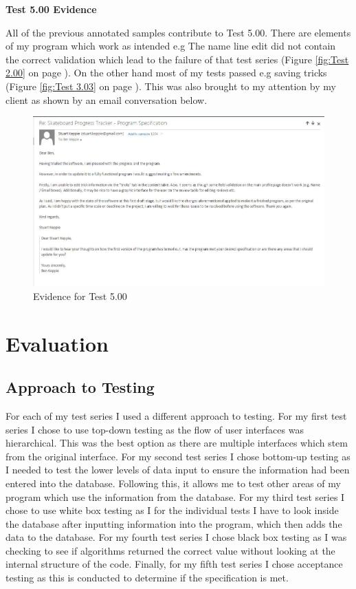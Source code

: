 \textbf{Test 5.00 Evidence}

All of the previous annotated samples contribute to Test 5.00. There are elements of my program which work as intended e.g The name line edit did not contain the correct validation which lead to the failure of that test series  (Figure \ref{fig:Test 2.00} on page \pageref{fig:Test 2.00}). On the other hand most of my tests passed e.g saving tricks  (Figure \ref{fig:Test 3.03} on page \pageref{fig:Test 3.03}). This was also brought to my attention by my client as shown by an email conversation below.


\begin{figure}[H]
    \includegraphics[width=\textwidth]{./Testing/AnnotatedSamples/StuartEmail.jpg}
    \caption{Evidence for Test 5.00} \label{fig:Test 5.00}
\end{figure}



\section{Evaluation}

\subsection{Approach to Testing}

For each of my test series I used a different approach to testing. For my first test series I chose to use top-down testing as the flow of user interfaces was hierarchical. This was the best option as there are multiple interfaces which stem from the original interface. For my second test series I chose bottom-up testing as I needed to test the lower levels of data input to ensure the information had been entered into the database. Following this, it allows me to test other areas of my program which use the information from the database. For my third test series I chose to use white box testing as I for the individual tests I have to look inside the database after inputting information into the program, which then adds the data to the database. For my fourth test series I chose black box testing as I was checking to see if algorithms returned the correct value without looking at the internal structure of the code. Finally, for my fifth test series I chose acceptance testing as this is conducted to determine if the specification is met.


